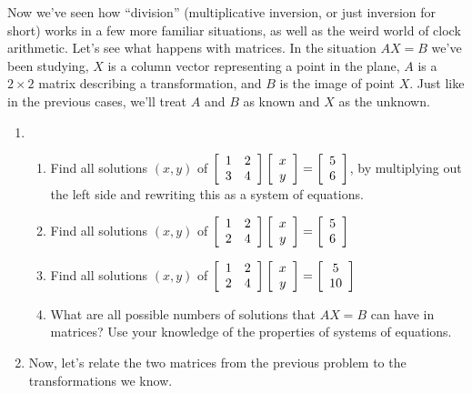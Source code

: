 \documentclass[../gatm.tex]{subfiles}
\begin{document}
Now we've seen how ``division'' (multiplicative inversion, or just inversion for short) works in a few more familiar situations, as well as the weird world of clock arithmetic. Let's see what happens with matrices. In the situation $AX=B$ we've been studying, $X$ is a column vector representing a point in the plane, $A$ is a $2\times 2$ matrix describing a transformation, and $B$ is the image of point $X$. Just like in the previous cases, we'll treat $A$ and $B$ as known and $X$ as the unknown.

\begin{enumerate}
\setcounter{enumi}{\value{problem_i}}
\item \begin{enumerate}
\item \label{prob:needed_for_matrix_undo3}Find all solutions $(x,y)$ of $\left[\begin{array}{cc} 1 & 2 \\ 3 & 4 \end{array}\right]\left[\begin{array}{c} x \\ y \end{array}\right]=\left[\begin{array}{c} 5 \\ 6 \end{array}\right]$, by multiplying out the left side and rewriting this as a system of equations.
\item \label{prob:needed_for_matrix_undo4}Find all solutions $(x,y)$ of $\left[\begin{array}{cc} 1 & 2 \\ 2 & 4 \end{array}\right]\left[\begin{array}{c} x \\ y \end{array}\right]=\left[\begin{array}{c} 5 \\ 6 \end{array}\right]$
\item Find all solutions $(x,y)$ of $\left[\begin{array}{cc} 1 & 2 \\ 2 & 4 \end{array}\right]\left[\begin{array}{c} x \\ y \end{array}\right]=\left[\begin{array}{c} 5 \\ 10 \end{array}\right]$
\item What are all possible numbers of solutions that $AX=B$ can have in matrices? Use your knowledge of the properties of systems of equations.
\end{enumerate}
\item Now, let's relate the two matrices from the previous problem to the transformations we know.
\begin{enumerate}

\end{enumerate}
\end{enumerate}
\end{document}

